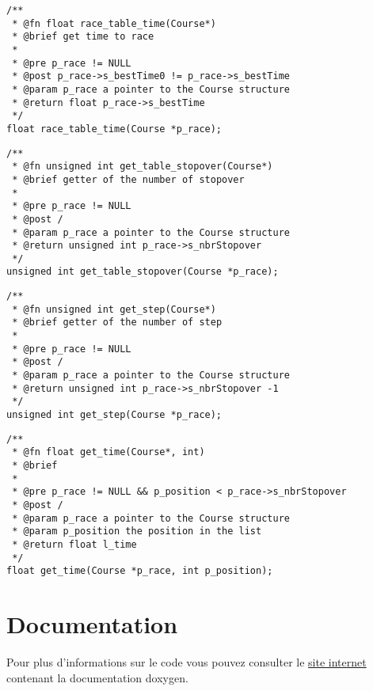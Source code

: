 \documentclass[a4paper, 11pt, oneside]{article}
\begin{document}
		\begin{lstlisting}
/**
 * @fn float race_table_time(Course*)
 * @brief get time to race
 *
 * @pre p_race != NULL
 * @post p_race->s_bestTime0 != p_race->s_bestTime
 * @param p_race a pointer to the Course structure
 * @return float p_race->s_bestTime
 */
float race_table_time(Course *p_race);
		\end{lstlisting}

		\begin{lstlisting}
/**
 * @fn unsigned int get_table_stopover(Course*)
 * @brief getter of the number of stopover
 *
 * @pre p_race != NULL
 * @post /
 * @param p_race a pointer to the Course structure
 * @return unsigned int p_race->s_nbrStopover
 */
unsigned int get_table_stopover(Course *p_race);
		\end{lstlisting}

		\begin{lstlisting}
/**
 * @fn unsigned int get_step(Course*)
 * @brief getter of the number of step
 *
 * @pre p_race != NULL
 * @post /
 * @param p_race a pointer to the Course structure
 * @return unsigned int p_race->s_nbrStopover -1
 */
unsigned int get_step(Course *p_race);
		\end{lstlisting}

		\begin{lstlisting}
/**
 * @fn float get_time(Course*, int)
 * @brief
 *
 * @pre p_race != NULL && p_position < p_race->s_nbrStopover
 * @post /
 * @param p_race a pointer to the Course structure
 * @param p_position the position in the list
 * @return float l_time
 */
float get_time(Course *p_race, int p_position);
		\end{lstlisting}

\section{Documentation}
	Pour plus d'informations sur le code vous pouvez consulter le \href{doc/html/index.html}{site internet} contenant la documentation doxygen.
\end{document}
